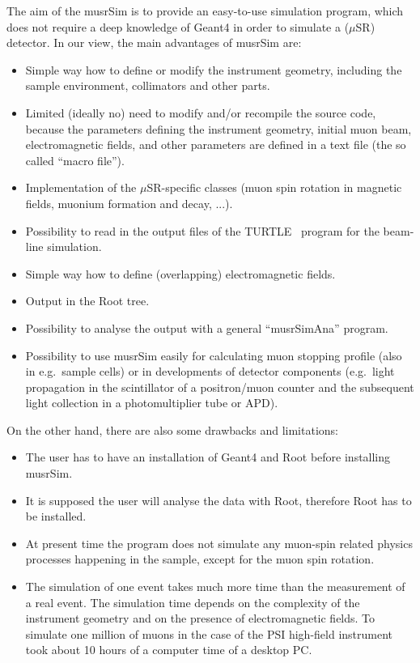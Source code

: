 \documentclass[twoside]{dis04}
\begin{document}
The aim of the musrSim is to provide an easy-to-use simulation program, which does
not require a deep knowledge of Geant4 in order to simulate a ($\mu$SR) detector.
In our view, the main advantages of musrSim are:
\begin{itemize}
	\item Simple way how to define or modify the instrument geometry, including
	      the sample environment, collimators and other parts.
	\item Limited (ideally no) need to modify and/or recompile the source code,
	      because the parameters defining the instrument geometry, initial muon beam,
	      electromagnetic fields, and other parameters are defined in
	      a text file (the so called ``macro file'').
	\item Implementation of the  $\mu$SR-specific classes (muon spin rotation
	      in magnetic fields, muonium formation and decay, ...).
	\item Possibility to read in the output files of the TURTLE~\cite{turtle}
	      program for the beam-line simulation.
	\item Simple way how to define (overlapping) electromagnetic fields.
	\item Output in the Root tree.
	\item Possibility to analyse the output with a general ``musrSimAna'' program.
	\item Possibility to use musrSim easily for calculating muon stopping profile 
	      (also in e.g.\ sample cells) or in developments of detector components
	      (e.g.\ light propagation in the scintillator of a positron/muon counter
	      and the subsequent light collection in a photomultiplier tube or APD).
\end{itemize}
%
On the other hand, there are also some drawbacks and limitations:
\begin{itemize}
	\item The user has to have an installation of Geant4 and Root before installing musrSim. 
	\item It is supposed the user will analyse the data with Root, therefore
	      Root has to be installed.
	\item At present time the program does not simulate any muon-spin related
              physics processes happening in the sample, except for the muon 
              spin rotation.
	\item The simulation of one event takes much more time than the measurement
	      of a real event. The simulation time depends on the
	      complexity of the instrument geometry and on the presence of
	      electromagnetic fields.  To simulate one million of muons
	      in the case of the PSI high-field instrument took about 10 hours
	      of a computer time of a desktop PC.
\end{itemize}
\end{document}
